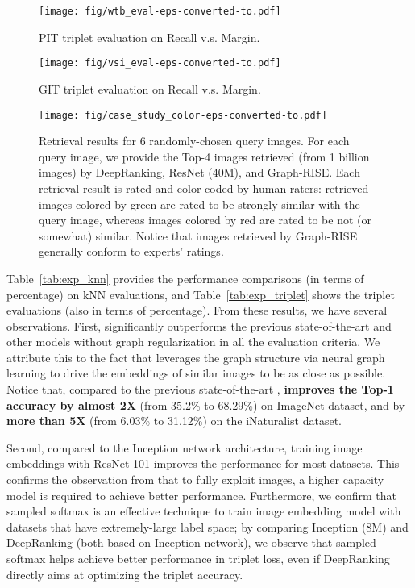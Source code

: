 \documentclass[sigconf]{acmart}
\begin{document}
\begin{figure}[tbp]
  \texttt{[image: fig/wtb\_eval-eps-converted-to.pdf]}
  \caption{PIT triplet evaluation on Recall v.s. Margin.}
  \label{fig:wtb_pr}
\end{figure}

\begin{figure}[tbp]
  \texttt{[image: fig/vsi\_eval-eps-converted-to.pdf]}
  \caption{GIT triplet evaluation on Recall v.s. Margin.}
  \label{fig:vsi_pr}
\end{figure}

\begin{figure*}[tbp]
  \texttt{[image: fig/case\_study\_color-eps-converted-to.pdf]}
  \caption{Retrieval results for 6 randomly-chosen query images. For each query image, we provide the Top-4 images retrieved (from 1 billion images) by DeepRanking, ResNet (40M), and Graph-RISE. Each retrieval result is rated and color-coded by human raters: retrieved images colored by green are rated to be strongly similar with the query image, whereas images colored by red are rated to be not (or somewhat) similar. Notice that images retrieved by Graph-RISE generally conform to experts' ratings.}
  \label{fig:exp_examples}
\end{figure*}

Table~\ref{tab:exp_knn} provides the performance comparisons (in terms of percentage) on kNN evaluations, and Table~\ref{tab:exp_triplet} shows the triplet evaluations (also in terms of percentage). From these results, we have several observations. First, {\ourmodel} significantly outperforms the previous state-of-the-art \cite{wang2014learning} and other models without graph regularization in all the evaluation criteria. We attribute this to the fact that {\ourmodel} leverages the graph structure via neural graph learning to drive the embeddings of similar images to be as close as possible. Notice that, compared to the previous state-of-the-art \cite{wang2014learning}, {\ourmodel} {\bf improves the Top-1 accuracy by almost 2X} (from 35.2\% to 68.29\%) on ImageNet dataset, and by {\bf more than 5X} (from 6.03\% to 31.12\%) on the iNaturalist dataset. 

Second, compared to the Inception network architecture, training image embeddings with ResNet-101 improves the performance for most datasets. This confirms the observation from \cite{sun2017revisiting} that to fully exploit  images, a higher capacity model is required to achieve better performance. Furthermore, we confirm that sampled softmax is an effective technique to train image embedding model with datasets that have extremely-large label space; by comparing Inception (8M) and DeepRanking \cite{wang2014learning} (both based on Inception network), we observe that sampled softmax helps achieve better performance in triplet loss, even if DeepRanking directly aims at optimizing the triplet accuracy.
\end{document}
